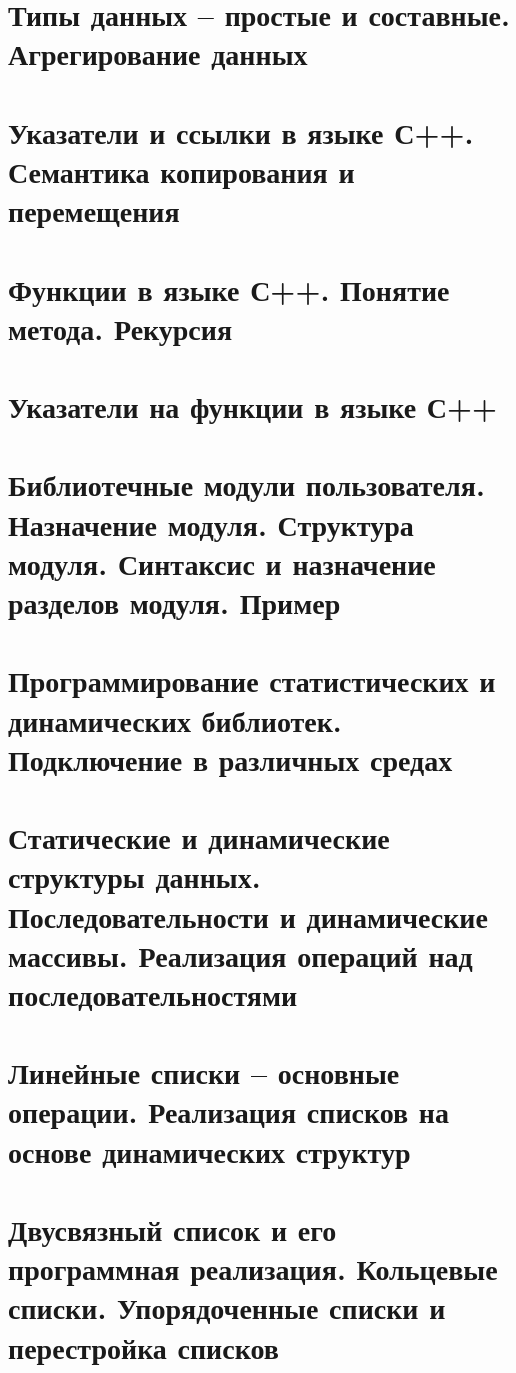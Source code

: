 \section{Типы данных – простые и составные. Агрегирование данных}
\section{Указатели и ссылки в языке С++. Семантика копирования и перемещения}
\section{Функции в языке С++. Понятие метода. Рекурсия}
\section{Указатели на функции в языке С++}
\section{Библиотечные модули пользователя. Назначение модуля. Структура модуля. Синтаксис и назначение разделов модуля. Пример}
\section{Программирование статистических и динамических библиотек.  Подключение в различных средах}
\section{Статические и динамические структуры данных. Последовательности и динамические массивы. Реализация операций над последовательностями}
\section{Линейные списки – основные операции. Реализация списков на основе динамических структур}
\section{Двусвязный список и его программная реализация. Кольцевые списки.  Упорядоченные списки и перестройка списков}
